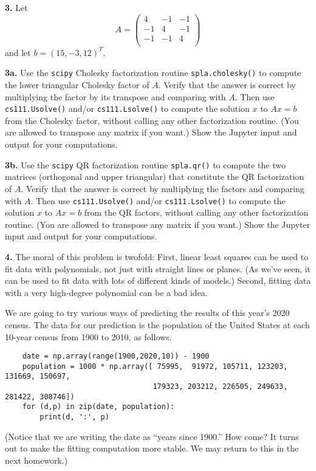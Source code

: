 \documentclass[11pt]{article}
\begin{document}
\par\bigskip
{\bf 3.} 
Let
$$A =
   \left(
   \begin{array}{ccc}
    4 & -1 & -1 \\ 	
   -1 &  4 & -1 \\ 
   -1 & -1 &  4 \\
   \end{array} \right)
$$
and let $b = (15, -3, 12)^T$.

\par\medskip
{\bf 3a.}
Use the {\tt scipy} Cholesky factorization routine {\tt spla.cholesky()}
to compute the lower triangular Cholesky factor of $A$.
Verify that the answer is correct by multiplying the factor by its transpose and
comparing with $A$.
Then use {\tt cs111.Usolve()} and/or {\tt cs111.Lsolve()} to compute the solution $x$
to $Ax=b$ from the Cholesky factor, without calling any other factorization routine.
(You are allowed to transpose any matrix if you want.)
Show the Jupyter input and output for your computations.

\par\medskip
{\bf 3b.}
Use the {\tt scipy} QR factorization routine {\tt spla.qr()}
to compute the two matrices (orthogonal and upper triangular) that
constitute the QR factorization of $A$.
Verify that the answer is correct by multiplying the factors and comparing with $A$.
Then use {\tt cs111.Usolve()} and/or {\tt cs111.Lsolve()} to compute the solution $x$
to $Ax=b$ from the QR factors, without calling any other factorization routine.
(You are allowed to transpose any matrix if you want.)
Show the Jupyter input and output for your computations.


\par\bigskip
{\bf 4.}
The moral of this problem is twofold: 
First, linear least squares can be used to fit data with polynomials,
not just with straight lines or planes.
(As we've seen, it can be used to fit data with lots of different kinds of models.)
Second, fitting data with a very high-degree polynomial can be a bad idea.

We are going to try various ways of predicting the results of this year's 2020 census.
The data for our prediction is the population of the United States at each
10-year census from 1900 to 2010, as follows.
\begin{verbatim}
    date = np.array(range(1900,2020,10)) - 1900
    population = 1000 * np.array([ 75995,  91972, 105711, 123203, 131669, 150697, 
                                  179323, 203212, 226505, 249633, 281422, 308746])
    for (d,p) in zip(date, population):
        print(d, ':', p)
\end{verbatim}
(Notice that we are writing the date as ``years since 1900.''
How come?
It turns out to make the fitting computation more stable.
We may return to this in the next homework.)
\end{document}
